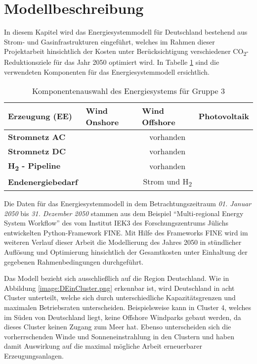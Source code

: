 \section{Modellbeschreibung}
\label{chap:modellbeschreibung}
In diesem Kapitel wird das Energiesystemmodell für Deutschland bestehend aus Strom- und Gasinfrastrukturen eingeführt, welches im Rahmen dieser Projektarbeit hinsichtlich der Kosten unter Berücksichtigung verschiedener CO\textsubscript{2}-Reduktionsziele für das Jahr 2050 optimiert wird. In Tabelle \ref{tab:systemdesign2} sind die verwendeten Komponenten für das Energiesystemmodell ersichtlich.

\begin{table}[ht!]
    \centering
    \begin{tabular}{|lcll|}
        \hline
        \multicolumn{1}{|l|}{\textbf{Erzeugung (EE)}} & \multicolumn{1}{l|}{Wind Onshore} & \multicolumn{1}{l|}{Wind Offshore} & Photovoltaik \\ \hline
        \multicolumn{1}{|l|}{\textbf{Stromnetz AC}}     & \multicolumn{3}{c|}{vorhanden}                \\ \hline
        \multicolumn{1}{|l|}{\textbf{Stromnetz DC}}     & \multicolumn{3}{c|}{vorhanden}                \\ \hline
        \multicolumn{1}{|l|}{\textbf{H\textsubscript{2} - Pipeline}}    & \multicolumn{3}{c|}{vorhanden}                \\ \hline
        \multicolumn{1}{|l|}{\textbf{Endenergiebedarf}} & \multicolumn{3}{c|}{Strom und H\textsubscript{2}} \\ \hline
    \end{tabular}
    \caption{Komponentenauswahl des Energiesystems für Gruppe 3}
    \label{tab:systemdesign2}
\end{table}


Die Daten für das Energiesystemmodell in dem Betrachtungszeitraum \textit{01. Januar 2050} bis \textit{31. Dezember 2050} stammen aus dem Beispiel ``Multi-regional Energy System Workflow'' des vom Institut IEK3 des Forschungszentrums Jülichs entwickelten Python-Framework FINE. \cite{WELDER20181130}
Mit Hilfe des Frameworks FINE wird im weiteren Verlauf dieser Arbeit die Modellierung des Jahres 2050 in stündlicher Auflösung und Optimierung hinsichtlich der Gesamtkosten unter Einhaltung der gegebenen Rahmenbedingungen durchgeführt.


Das Modell bezieht sich ausschließlich auf die Region Deutschland. Wie in Abbildung \ref{image:DEinCluster.png} erkennbar ist, wird Deutschland in acht Cluster unterteilt, welche sich durch unterschiedliche Kapazitätsgrenzen und maximalen Betriebsraten unterscheiden. Beispielsweise kann in Cluster 4, welches im Süden von Deutschland liegt, keine Offshore Windparks gebaut werden, da dieses Cluster keinen Zugang zum Meer hat. Ebenso unterscheiden sich die vorherrschenden Winde und Sonneneinstrahlung in den Clustern und haben damit Auswirkung auf die maximal mögliche Arbeit erneuerbarer Erzeugungsanlagen.  

